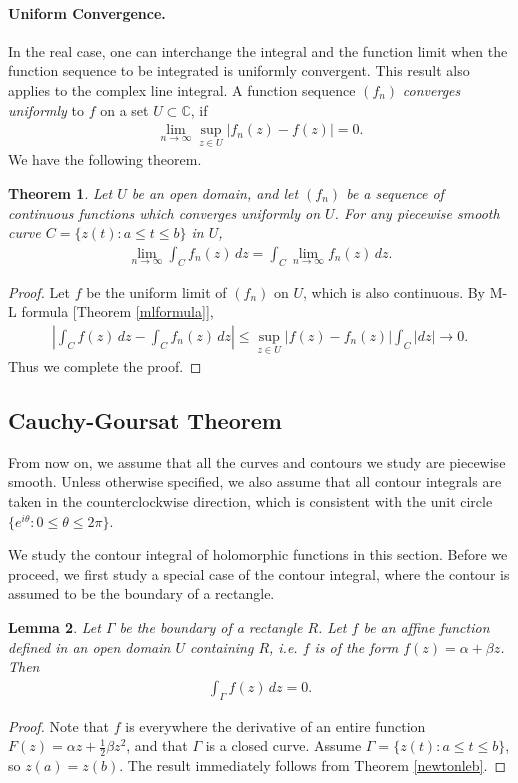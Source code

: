 \documentclass{article}
\numberwithin{equation}{section}
\newcommand{\bbC}{\mathbb{C}}
\theoremstyle{plain}
\newtheorem{theorem}{Theorem}[section]
\newtheorem{lemma}[theorem]{Lemma}
\theoremstyle{definition}
\begin{document}
\paragraph{Uniform Convergence.} In the real case, one can interchange the integral and the function limit when the function sequence to be integrated is uniformly convergent. This result also applies to the complex line integral. A function sequence $(f_n)$ \textit{converges uniformly} to $f$ on a set $U\subset\bbC$, if
\begin{align*}
	\lim_{n\to\infty}\sup_{z\in U}\vert f_n(z)-f(z)\vert = 0.
\end{align*}
We have the following theorem.
\begin{theorem}\label{unifconvergence}
Let $U$ be an open domain, and let $(f_n)$ be a sequence of continuous functions which converges uniformly on $U$. For any piecewise smooth curve $C=\{z(t):a\leq t\leq b\}$ in $U$,
\begin{align*}
	\lim_{n\to\infty}\int_C f_n(z)\,dz=\int_C\lim_{n\to\infty}f_n(z)\,dz.
\end{align*}
\end{theorem}
\begin{proof}
Let $f$ be the uniform limit of $(f_n)$ on $U$, which is also continuous. By M-L formula [Theorem \ref{mlformula}],
\begin{align*}
	\left\vert\int_C f(z)\,dz-\int_C f_n(z)\,dz\right\vert\leq\sup_{z\in U}\vert f(z)-f_n(z)\vert\int_C\vert dz\vert\to 0.
\end{align*}
Thus we complete the proof.
\end{proof}

\subsection{Cauchy-Goursat Theorem}
From now on, we assume that all the curves and contours we study are piecewise smooth. Unless otherwise specified, we also assume that all contour integrals are taken in the counterclockwise direction, which is consistent with the unit circle $\{e^{i\theta}:0\leq\theta\leq 2\pi\}$.

We study the contour integral of holomorphic functions in this section. Before we proceed, we first study a special case of the contour integral, where the contour is assumed to be the boundary of a rectangle.
\begin{lemma}\label{affinecontour}
Let $\Gamma$ be the boundary of a rectangle $R$. Let $f$ be an affine function defined in an open domain $U$ containing $R$, i.e. $f$ is of the form $f(z)=\alpha+\beta z$. Then
\begin{align*}
	\int_\Gamma f(z)\,dz=0.
\end{align*}
\end{lemma}
\begin{proof}
Note that $f$ is everywhere the derivative of an entire function $F(z)=\alpha z+\frac{1}{2}\beta z^2$, and that $\Gamma$ is a closed curve. Assume $\Gamma=\{z(t):a\leq t\leq b\}$, so $z(a)=z(b)$. The result immediately follows from Theorem \ref{newtonleb}.
\end{proof}
\end{document}
